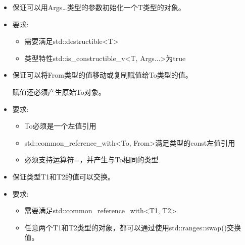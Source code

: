 
\begin{itemize}
\item
保证可以用Args…类型的参数初始化一个T类型的对象。

\item
要求:
\begin{itemize}
\item
需要满足std::destructible<T> 

\item
类型特性std::is\_constructible\_v<T, Args...>为true
\end{itemize}
\end{itemize}


\begin{itemize}
\item
保证可以将From类型的值移动或复制赋值给To类型的值。

赋值还必须产生原始To对象。

\item
要求:
\begin{itemize}
\item
To必须是一个左值引用

\item
std::common\_reference\_with<To, From>满足类型的const左值引用

\item
必须支持运算符=，并产生与To相同的类型
\end{itemize}
\end{itemize}


\begin{itemize}
\item
保证类型T1和T2的值可以交换。

\item
要求:
\begin{itemize}
\item
需要满足std::common\_reference\_with<T1, T2>

\item
任意两个T1和T2类型的对象，都可以通过使用std::ranges::swap()交换值。
\end{itemize}
\end{itemize}


